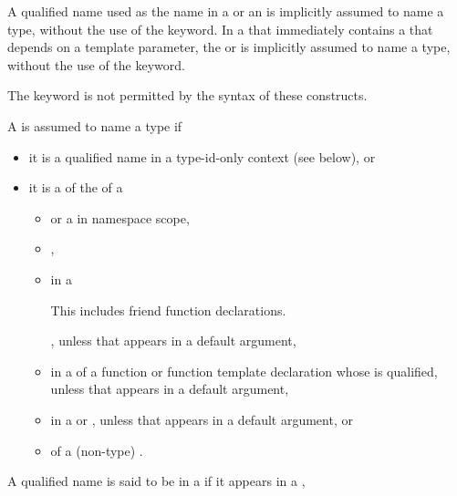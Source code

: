 \pnum
A qualified name used as the name in a
or an
is implicitly assumed to name a type, without the use of the
keyword.
In a  that immediately contains a 
that depends on a template parameter, the  or 
is implicitly assumed to name a type, without the use of the  keyword.
\begin{note}
The
keyword is not permitted by the syntax of these constructs.
\end{note}

\pnum
A 
is assumed to name a type if
\begin{itemize}
\item it is a qualified name in a type-id-only context (see below), or
\item it is a  of the  of a
\begin{itemize}
\item {} or a  in namespace scope,
\item {},
\item {} in a 
\begin{footnote}
This includes friend function declarations.
\end{footnote}%
,
unless that  appears in a default argument,
\item {} in a 
of a function or function template declaration
whose  is qualified,
unless that 
appears in a default argument,
\item {} in a 
or ,
unless that  appears in a default argument, or
\item {} of a (non-type) .
\end{itemize}
\end{itemize}
A qualified name is said to be in a 
if it appears in a
,
